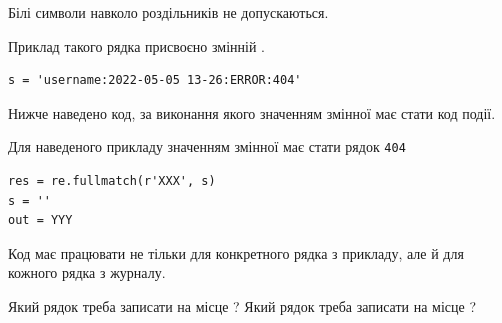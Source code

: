 \documentclass[12pt, ukrainian]{article}
\def\code#1{\Verb!#1!}
\begin{document}
{Білі символи навколо роздільників не допускаються.

Приклад такого рядка присвоєно змінній .



\begin{verbatim}
s = 'username:2022-05-05 13-26:ERROR:404'
\end{verbatim}


Нижче наведено код, за виконання якого значенням змінної  має стати код події.

Для наведеного прикладу значенням змінної  має стати рядок \code{404}



\begin{verbatim}
res = re.fullmatch(r'XXX', s)
s = ''
out = YYY
\end{verbatim}


Код має працювати не тільки для конкретного рядка з прикладу, але й для кожного рядка з журналу.


Який рядок треба записати на місце  ?
Який рядок треба записати на місце  ?\par

}
\end{document}
